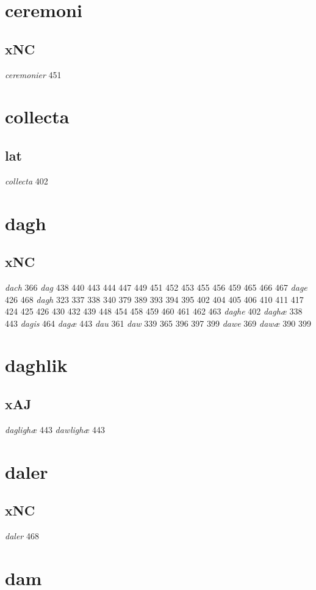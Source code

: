 \documentclass[a4paper,twocolumn]{article}
\begin{document}
\section{ceremoni}
\label{sec:orgea084f4}
\subsection{xNC}
\label{sec:org316ddba}
\emph{ceremonier} 451 
\section{collecta}
\label{sec:org181d802}
\subsection{lat}
\label{sec:org84e3e7c}
\emph{collecta} 402 
\section{dagh}
\label{sec:orgdbc6808}
\subsection{xNC}
\label{sec:orga2b045d}
\emph{dach} 366 \emph{dag} 438 440 443 444 447 449 451 452 453 455 456 459 465 466 467 \emph{dage} 426 468 \emph{dagh} 323 337 338 340 379 389 393 394 395 402 404 405 406 410 411 417 424 425 426 430 432 439 448 454 458 459 460 461 462 463 \emph{daghe} 402 \emph{daghæ} 338 443 \emph{dagis} 464 \emph{dagæ} 443 \emph{dau} 361 \emph{daw} 339 365 396 397 399 \emph{dawe} 369 \emph{dawæ} 390 399 
\section{daghlik}
\label{sec:orgce1b971}
\subsection{xAJ}
\label{sec:orgac03aac}
\emph{daglighæ} 443 \emph{dawlighæ} 443 
\section{daler}
\label{sec:orgbd6f5fd}
\subsection{xNC}
\label{sec:orgb778150}
\emph{daler} 468 
\section{dam}
\label{sec:orgb2c4d67}
\end{document}
